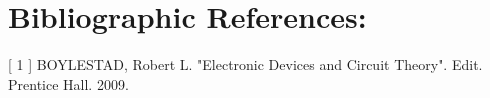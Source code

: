 \section{Bibliographic References:}

[ 1 ] BOYLESTAD, Robert L. "Electronic Devices and Circuit Theory". Edit. Prentice Hall. 2009.